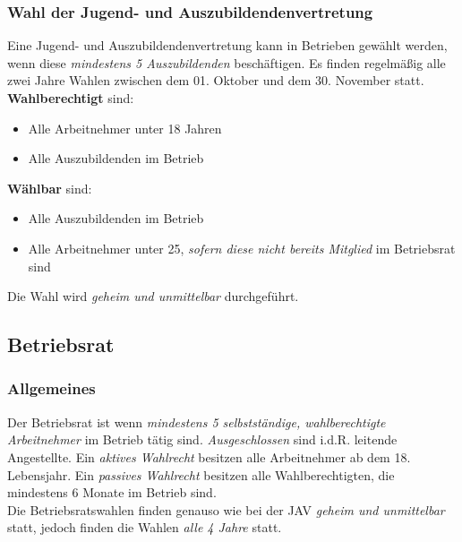 \documentclass[a4paper, 12pt]{report}
\begin{document}
\subsubsection{Wahl der Jugend- und Auszubildendenvertretung}

Eine Jugend- und Auszubildendenvertretung kann in Betrieben gewählt werden, 
wenn diese \emph{mindestens 5 Auszubildenden} beschäftigen. Es finden 
regelmäßig alle zwei Jahre  Wahlen zwischen dem 01. Oktober und dem 30. November
statt. \\

\textbf{Wahlberechtigt} sind: 

\begin{itemize}
    \item Alle Arbeitnehmer unter 18 Jahren
    \item Alle Auszubildenden im Betrieb
\end{itemize}

\textbf{Wählbar} sind: 
\begin{itemize}
    \item Alle Auszubildenden im Betrieb
    \item Alle Arbeitnehmer unter 25, \emph{sofern diese nicht bereits Mitglied}
        im Betriebsrat sind
\end{itemize}

Die Wahl wird \emph{geheim und unmittelbar} durchgeführt.

\newpage
\subsection{Betriebsrat}

\subsubsection{Allgemeines}

Der Betriebsrat ist wenn \emph{mindestens 5 selbstständige, wahlberechtigte 
Arbeitnehmer} im Betrieb tätig sind. \emph{Ausgeschlossen} sind i.d.R. leitende 
Angestellte. Ein \emph{aktives Wahlrecht} besitzen alle Arbeitnehmer ab dem 18.
Lebensjahr. Ein \emph{passives Wahlrecht} besitzen alle Wahlberechtigten, die 
mindestens 6 Monate im Betrieb sind. \\

Die Betriebsratswahlen finden genauso wie bei der JAV \emph{geheim und 
unmittelbar} statt, jedoch finden die Wahlen \emph{alle 4 Jahre} statt. \\
\end{document}
